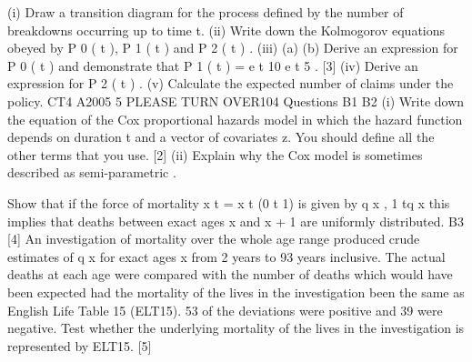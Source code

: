 \documentclass[a4paper,12pt]{article}
\begin{document}
\begin{enumerate}
(i)
Draw a transition diagram for the process defined by the number of breakdowns occurring up to time t.
(ii) Write down the Kolmogorov equations obeyed by P 0 ( t ), P 1 ( t ) and P 2 ( t ) .
(iii) (a)
(b)
Derive an expression for P 0 ( t ) and
demonstrate that P 1 ( t ) = e
t
10
e
t
5 .
[3]
(iv) Derive an expression for P 2 ( t ) .
(v) Calculate the expected number of claims under the policy.
CT4 A2005
5
PLEASE TURN OVER104 Questions
B1
B2
(i) Write down the equation of the Cox proportional hazards model in which the hazard function depends on duration t and a vector of covariates z. You should define all the other terms that you use.
[2]
(ii) Explain why the Cox model is sometimes described as semi-parametric . 

Show that if the force of mortality
x t
=
x t
(0
t
1) is given by
q x
,
1 tq x
this implies that deaths between exact ages x and x + 1 are uniformly distributed.
B3
[4]
An investigation of mortality over the whole age range produced crude estimates of q x for exact ages x from 2 years to 93 years inclusive. The actual deaths at each age were compared with the number of deaths which would have been expected had the
mortality of the lives in the investigation been the same as English Life Table 15 (ELT15). 53 of the deviations were positive and 39 were negative.
Test whether the underlying mortality of the lives in the investigation is represented
by ELT15.
[5]



\end{enumerate}
\end{document}
